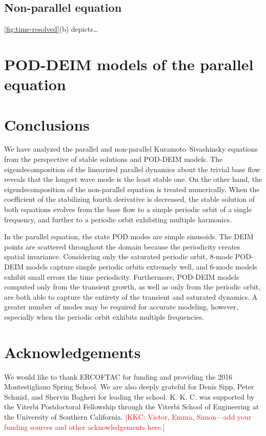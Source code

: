 \documentclass[11pt]{article}
\newcommand{\KSE}{Kuramoto--Sivashinsky equation}
\newcommand{\kkc}[1]{\textcolor{red}{[KKC: #1]}}
\begin{document}
\subsection{Non-parallel equation}

\autoref{fig:time-resolved}(b) depicts\ldots

\section{POD-DEIM models of the parallel equation}
\label{sec:pod-deim}

\section{Conclusions}
\label{sec:conclusions}

We have analyzed the parallel and non-parallel {\KSE}s from the perspective of stable solutions and POD-DEIM models.
The eigendecomposition of the linearized parallel dynamics about the trivial base flow reveals that the longest wave mode is the least stable one.
On the other hand, the eigendecomposition of the non-parallel equation is treated numerically.
When the coefficient of the stabilizing fourth derivative is decreased, the stable solution of both equations evolves from the base flow to a simple periodic orbit of a single frequency, and further to a periodic orbit exhibiting multiple harmonics.

In the parallel equation, the state POD modes are simple sinusoids.
The DEIM points are scattered throughout the domain because the periodicity creates spatial invariance.
Considering only the saturated periodic orbit, 8-mode POD-DEIM models capture simple periodic orbits extremely well, and 6-mode models exhibit small errors the time periodicity.
Furthermore, POD-DEIM models computed only from the transient growth, as well as only from the periodic orbit, are both able to capture the entirety of the transient and saturated dynamics.
A greater number of modes may be required for accurate modeling, however, especially when the periodic orbit exhibits multiple frequencies.

\section{Acknowledgements}

We would like to thank ERCOFTAC for funding and providing the 2016 Montestigliano Spring School.
We are also deeply grateful for Denis Sipp, Peter Schmid, and Shervin Bagheri for leading the school.
K. K. C. was supported by the Viterbi Postdoctoral Fellowship through the Viterbi School of Engineering at the University of Southern California.
\kkc{Victor, Emma, Simon---add your funding sources and other acknowledgements here.}


\end{document}
